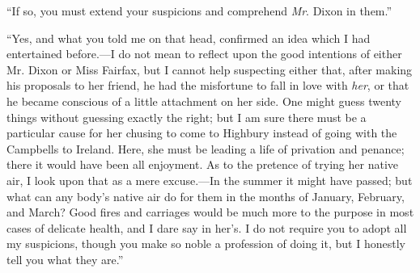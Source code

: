


“If so, you must extend your suspicions and comprehend {\em Mr}. Dixon in them.”


“Yes, and what you told me on that head, confirmed an idea which I had entertained before.---I do not mean to reflect upon the good intentions of either Mr. Dixon or Miss Fairfax, but I cannot help suspecting either that, after making his proposals to her friend, he had the misfortune to fall in love with {\em her}, or that he became conscious of a little attachment on her side. One might guess twenty things without guessing exactly the right; but I am sure there must be a particular cause for her chusing to come to Highbury instead of going with the Campbells to Ireland. Here, she must be leading a life of privation and penance; there it would have been all enjoyment. As to the pretence of trying her native air, I look upon that as a mere excuse.---In the summer it might have passed; but what can any body's native air do for them in the months of January, February, and March? Good fires and carriages would be much more to the purpose in most cases of delicate health, and I dare say in her's. I do not require you to adopt all my suspicions, though you make so noble a profession of doing it, but I honestly tell you what they are.”



